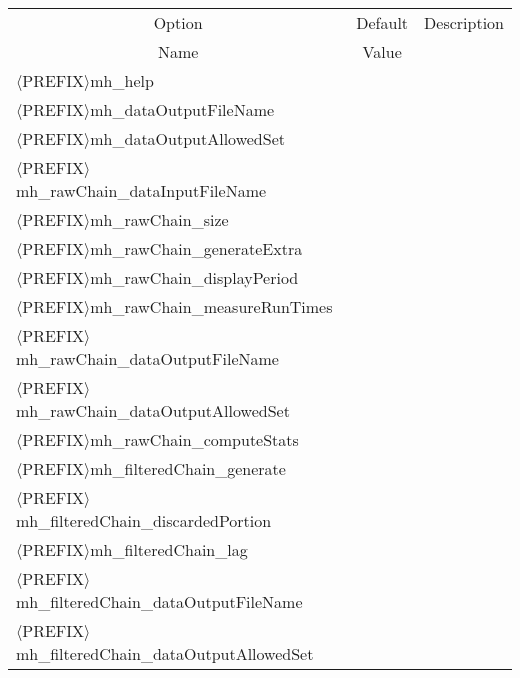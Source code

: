 \begin{table}[!h]
\begin{center}
\begin{tabular}{|l|c|c|}
\hline
\multicolumn{1}{|c|}{Option}                                    & Default & Description \\
\multicolumn{1}{|c|}{Name}                                      & Value   &             \\
\hline
\hline
$\langle$PREFIX$\rangle$mh\_help                                &         &             \\
\hline
$\langle$PREFIX$\rangle$mh\_dataOutputFileName                  &         &             \\
\hline
$\langle$PREFIX$\rangle$mh\_dataOutputAllowedSet                &         &             \\
\hline
$\langle$PREFIX$\rangle$mh\_rawChain\_dataInputFileName         &         &             \\
\hline
$\langle$PREFIX$\rangle$mh\_rawChain\_size                      &         &             \\
\hline
$\langle$PREFIX$\rangle$mh\_rawChain\_generateExtra             &         &             \\
\hline
$\langle$PREFIX$\rangle$mh\_rawChain\_displayPeriod             &         &             \\
\hline
$\langle$PREFIX$\rangle$mh\_rawChain\_measureRunTimes           &         &             \\
\hline
$\langle$PREFIX$\rangle$mh\_rawChain\_dataOutputFileName        &         &             \\
\hline
$\langle$PREFIX$\rangle$mh\_rawChain\_dataOutputAllowedSet      &         &             \\
\hline
$\langle$PREFIX$\rangle$mh\_rawChain\_computeStats              &         &             \\
\hline
$\langle$PREFIX$\rangle$mh\_filteredChain\_generate             &         &             \\
\hline
$\langle$PREFIX$\rangle$mh\_filteredChain\_discardedPortion     &         &             \\
\hline
$\langle$PREFIX$\rangle$mh\_filteredChain\_lag                  &         &             \\
\hline
$\langle$PREFIX$\rangle$mh\_filteredChain\_dataOutputFileName   &         &             \\
\hline
$\langle$PREFIX$\rangle$mh\_filteredChain\_dataOutputAllowedSet &         &             \\

\end{tabular}
\end{center}
\end{table}
